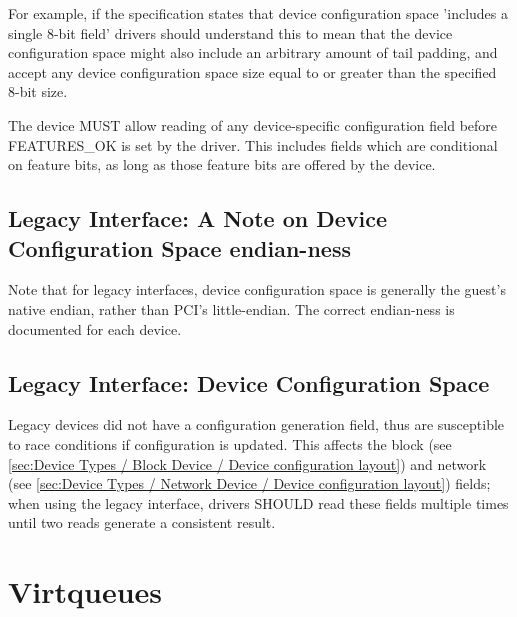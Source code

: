 \begin{note}
For example, if the specification states that device configuration
space 'includes a single 8-bit field' drivers should understand this to mean that
the device configuration space might also include an arbitrary amount of
tail padding, and accept any device configuration space size equal to or
greater than the specified 8-bit size.
\end{note}

The device MUST allow reading of any device-specific configuration
field before FEATURES_OK is set by the driver.  This includes fields which are
conditional on feature bits, as long as those feature bits are offered
by the device.

\subsection{Legacy Interface: A Note on Device Configuration Space endian-ness}\label{sec:Basic Facilities of a Virtio Device / Device Configuration Space / Legacy Interface: A Note on Configuration Space endian-ness}

Note that for legacy interfaces, device configuration space is generally the
guest's native endian, rather than PCI's little-endian.
The correct endian-ness is documented for each device.

\subsection{Legacy Interface: Device Configuration Space}\label{sec:Basic Facilities of a Virtio Device / Device Configuration Space / Legacy Interface: Device Configuration Space}

Legacy devices did not have a configuration generation field, thus are
susceptible to race conditions if configuration is updated.  This
affects the block  (see \ref{sec:Device Types /
Block Device / Device configuration layout}) and
network  (see \ref{sec:Device Types / Network Device /
Device configuration layout}) fields;
when using the legacy interface, drivers SHOULD
read these fields multiple times until two reads generate a consistent
result.

\section{Virtqueues}\label{sec:Basic Facilities of a Virtio Device / Virtqueues}

